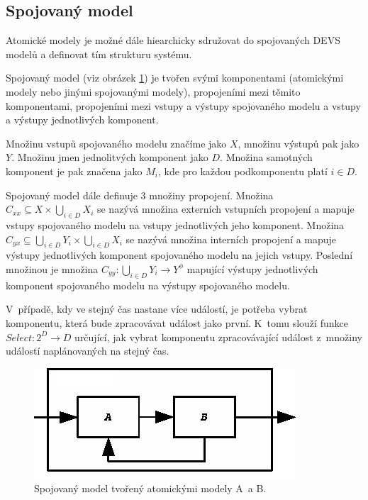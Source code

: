\subsection{Spojovaný model}

Atomické modely je možné dále hiearchicky sdružovat do spojovaných DEVS modelů a definovat tím strukturu systému.

Spojovaný model (viz obrázek \ref{fig:coupled}) je tvořen svými komponentami (atomickými modely nebo jinými spojovanými modely), propojeními mezi těmito komponentami, propojeními mezi vstupy a výstupy spojovaného modelu a vstupy a výstupy jednotlivých komponent. 

Množinu vstupů spojovaného modelu značíme jako $X$, množinu výstupů pak jako $Y$. Množinu jmen jednolitvých komponent jako $D$. Množina samotných komponent je pak značena jako $M_i$, kde pro každou podkomponentu platí $i \in D$.

Spojovaný model dále definuje 3 množiny propojení. Množina $C_{xx}\subseteq X \times \bigcup_{i \in D} X_i$ se nazývá množina externích vstupních propojení a mapuje vstupy spojovaného modelu na vstupy jednotlivých jeho komponent. Množina $C_{yx}\subseteq \bigcup_{i \in D} Y_i \times \bigcup_{i \in D} X_i$ se nazývá množina interních propojení a mapuje výstupy jednotlivých komponent spojovaného modelu na jejich vstupy. Poslední množinou je množina $C_{yy}: \bigcup_{i \in D} Y_i \rightarrow Y^\phi$ mapující výstupy jednotlivých komponent spojovaného modelu na výstupy spojovaného modelu.

V~případě, kdy ve stejný čas nastane více událostí, je potřeba vybrat komponentu, která bude zpracovávat událost jako první. K~tomu slouží funkce $Select:2^D \rightarrow D$ určující, jak vybrat komponentu zpracovávající událost z~množiny událostí naplánovaných na stejný čas.

\begin{figure}[ht]
\centering
\includegraphics[trim=0cm 0cm 0cm 0cm, scale=0.7]{fig/coupled}
\caption{Spojovaný model tvořený atomickými modely A~a B.}
\label{fig:coupled}
\end{figure}

